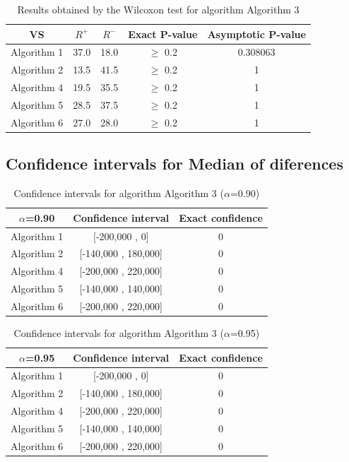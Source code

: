 \documentclass[a4paper,10pt]{article}
\begin{document}
\begin{table}[!htp]
\centering\small
\begin{tabular}{
|c|c|c|c|c|}
\hline
 VS & $R^{+}$ & $R^{-}$ & Exact P-value & Asymptotic P-value \\ \hline 
Algorithm 1 & 37.0 & 18.0 & $\geq$ 0.2 & 0.308063\\ \hline 
Algorithm 2 & 13.5 & 41.5 & $\geq$ 0.2 & 1\\ \hline 
Algorithm 4 & 19.5 & 35.5 & $\geq$ 0.2 & 1\\ \hline 
Algorithm 5 & 28.5 & 37.5 & $\geq$ 0.2 & 1\\ \hline 
Algorithm 6 & 27.0 & 28.0 & $\geq$ 0.2 & 1\\ \hline 

\end{tabular}
\caption{Results obtained by the Wilcoxon test for algorithm Algorithm 3}
\end{table}

\subsection{Confidence intervals for Median of diferences}

\begin{table}[!htp]
\centering\small
\begin{tabular}{
|c|c|c|}
\hline
 $\alpha$=0.90 & Confidence interval & Exact confidence \\ \hline 
Algorithm 1 & [-200,000 , 0] & 0\\ \hline 
Algorithm 2 & [-140,000 , 180,000] & 0\\ \hline 
Algorithm 4 & [-200,000 , 220,000] & 0\\ \hline 
Algorithm 5 & [-140,000 , 140,000] & 0\\ \hline 
Algorithm 6 & [-200,000 , 220,000] & 0\\ \hline 

\end{tabular}
\caption{Confidence intervals for algorithm Algorithm 3 ($\alpha$=0.90)}
\end{table}
\begin{table}[!htp]
\centering\small
\begin{tabular}{
|c|c|c|}
\hline
 $\alpha$=0.95 & Confidence interval & Exact confidence \\ \hline 
Algorithm 1 & [-200,000 , 0] & 0\\ \hline 
Algorithm 2 & [-140,000 , 180,000] & 0\\ \hline 
Algorithm 4 & [-200,000 , 220,000] & 0\\ \hline 
Algorithm 5 & [-140,000 , 140,000] & 0\\ \hline 
Algorithm 6 & [-200,000 , 220,000] & 0\\ \hline 

\end{tabular}
\caption{Confidence intervals for algorithm Algorithm 3 ($\alpha$=0.95)}
\end{table}
\end{document}
